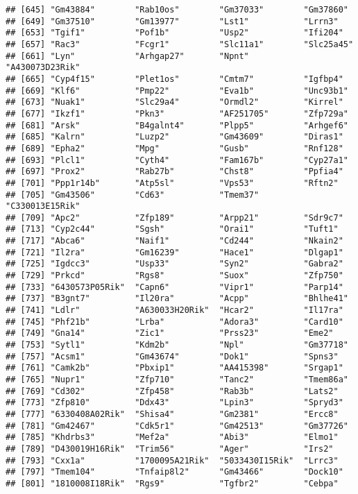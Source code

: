 \documentclass[
]{article}
\begin{document}
\begin{verbatim}
## [645] "Gm43884"        "Rab10os"        "Gm37033"        "Gm37860"       
## [649] "Gm37510"        "Gm13977"        "Lst1"           "Lrrn3"         
## [653] "Tgif1"          "Pof1b"          "Usp2"           "Ifi204"        
## [657] "Rac3"           "Fcgr1"          "Slc11a1"        "Slc25a45"      
## [661] "Lyn"            "Arhgap27"       "Npnt"           "A430073D23Rik" 
## [665] "Cyp4f15"        "Plet1os"        "Cmtm7"          "Igfbp4"        
## [669] "Klf6"           "Pmp22"          "Eva1b"          "Unc93b1"       
## [673] "Nuak1"          "Slc29a4"        "Ormdl2"         "Kirrel"        
## [677] "Ikzf1"          "Pkn3"           "AF251705"       "Zfp729a"       
## [681] "Arsk"           "B4galnt4"       "Plpp5"          "Arhgef6"       
## [685] "Kalrn"          "Luzp2"          "Gm43609"        "Diras1"        
## [689] "Epha2"          "Mpg"            "Gusb"           "Rnf128"        
## [693] "Plcl1"          "Cyth4"          "Fam167b"        "Cyp27a1"       
## [697] "Prox2"          "Rab27b"         "Chst8"          "Ppfia4"        
## [701] "Ppp1r14b"       "Atp5sl"         "Vps53"          "Rftn2"         
## [705] "Gm43506"        "Cd63"           "Tmem37"         "C330013E15Rik" 
## [709] "Apc2"           "Zfp189"         "Arpp21"         "Sdr9c7"        
## [713] "Cyp2c44"        "Sgsh"           "Orai1"          "Tuft1"         
## [717] "Abca6"          "Naif1"          "Cd244"          "Nkain2"        
## [721] "Il2ra"          "Gm16239"        "Hace1"          "Dlgap1"        
## [725] "Igdcc3"         "Usp33"          "Syn2"           "Gabra2"        
## [729] "Prkcd"          "Rgs8"           "Suox"           "Zfp750"        
## [733] "6430573P05Rik"  "Capn6"          "Vipr1"          "Parp14"        
## [737] "B3gnt7"         "Il20ra"         "Acpp"           "Bhlhe41"       
## [741] "Ldlr"           "A630033H20Rik"  "Hcar2"          "Il17ra"        
## [745] "Phf21b"         "Lrba"           "Adora3"         "Card10"        
## [749] "Gna14"          "Zic1"           "Prss23"         "Eme2"          
## [753] "Sytl1"          "Kdm2b"          "Npl"            "Gm37718"       
## [757] "Acsm1"          "Gm43674"        "Dok1"           "Spns3"         
## [761] "Camk2b"         "Pbxip1"         "AA415398"       "Srgap1"        
## [765] "Nupr1"          "Zfp710"         "Tanc2"          "Tmem86a"       
## [769] "Cd302"          "Zfp458"         "Rab3b"          "Lats2"         
## [773] "Zfp810"         "Ddx43"          "Lpin3"          "Spryd3"        
## [777] "6330408A02Rik"  "Shisa4"         "Gm2381"         "Ercc8"         
## [781] "Gm42467"        "Cdk5r1"         "Gm42513"        "Gm37726"       
## [785] "Khdrbs3"        "Mef2a"          "Abi3"           "Elmo1"         
## [789] "D430019H16Rik"  "Trim56"         "Ager"           "Irs2"          
## [793] "Cxx1a"          "1700095A21Rik"  "5033430I15Rik"  "Lrrc3"         
## [797] "Tmem104"        "Tnfaip8l2"      "Gm43466"        "Dock10"        
## [801] "1810008I18Rik"  "Rgs9"           "Tgfbr2"         "Cebpa"
\end{verbatim}
\end{document}
